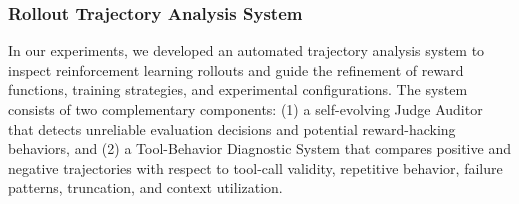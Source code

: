 \documentclass{huawei}
\begin{document}




\subsubsection{Rollout Trajectory Analysis System}
In our experiments, we developed an automated trajectory analysis system to inspect reinforcement learning rollouts and guide the refinement of reward functions, training strategies, and experimental configurations. The system consists of two complementary components: (1) a self-evolving Judge Auditor that detects unreliable evaluation decisions and potential reward-hacking behaviors, and (2) a Tool-Behavior Diagnostic System that compares positive and negative trajectories with respect to tool-call validity, repetitive behavior, failure patterns, truncation, and context utilization.
\end{document}
